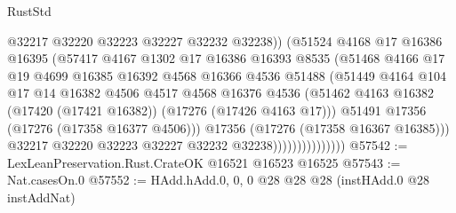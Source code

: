 \begin{lexlean}{RustStd}
\begin{coremodule}
                                  @32217
                                  @32220
                                  @32223
                                  @32227
                                  @32232
                                  @32238))
                              (@51524
                                @4168
                                @17
                                @16386
                                @16395
                                (@57417
                                  @4167
                                  @1302
                                  @17
                                  @16386
                                  @16393
                                  @8535
                                  (@51468
                                    @4166
                                    @17
                                    @19
                                    @4699
                                    @16385
                                    @16392
                                    @4568
                                    @16366
                                    @4536
                                    @51488
                                    (@51449
                                      @4164
                                      @104
                                      @17
                                      @14
                                      @16382
                                      @4506
                                      @4517
                                      @4568
                                      @16376
                                      @4536
                                      (@51462
                                        @4163
                                        @16382
                                        (@17420 (@17421 @16382))
                                        (@17276 (@17426 @4163 @17)))
                                      @51491
                                      @17356
                                      (@17276 (@17358 @16377 @4506)))
                                    @17356
                                    (@17276 (@17358 @16367 @16385)))
                                  @32217
                                  @32220
                                  @32223
                                  @32227
                                  @32232
                                  @32238)))))))))))))))
@57542 := LexLeanPreservation.Rust.CrateOK @16521 @16523 @16525
@57543 := Nat.casesOn.{0}
@57552 := HAdd.hAdd.{0, 0, 0} @28 @28 @28 (instHAdd.{0} @28 instAddNat)

\end{coremodule}
\end{lexlean}
